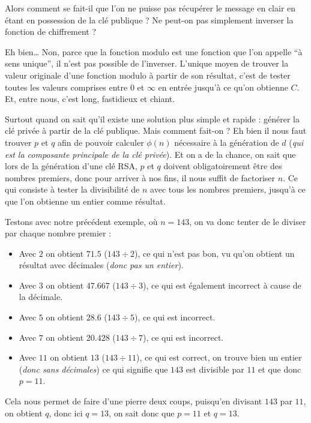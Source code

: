 \documentclass[
  paper=a4,
  ,captions=tableheading
]{scrartcl}
\providecommand{\tightlist}{%
  \setlength{\itemsep}{0pt}\setlength{\parskip}{0pt}}
\begin{document}
Alors comment se fait-il que l'on ne puisse pas récupérer le message en
clair en étant en possession de la clé publique ? Ne peut-on pas
simplement inverser la fonction de chiffrement ?

Eh bien\ldots{} Non, parce que la fonction \(\text{modulo}\) est une
fonction que l'on appelle ``à sens unique'', il n'est pas possible de
l'inverser. L'unique moyen de trouver la valeur originale d'une fonction
\(\text{modulo}\) à partir de son résultat, c'est de tester toutes les
valeurs comprises entre \(0\) et \(\infty\) en entrée jusqu'à ce qu'on
obtienne \(C\). Et, entre nous, c'est long, fastidieux et chiant.

Surtout quand on sait qu'il existe une solution plus simple et rapide :
générer la clé privée à partir de la clé publique. Mais comment fait-on
? Eh bien il nous faut trouver \(p\) et \(q\) afin de pouvoir calculer
\(\phi(n)\) nécessaire à la génération de \(d\) (\emph{qui est la
composante principale de la clé privée}). Et on a de la chance, on sait
que lors de la génération d'une clé RSA, \(p\) et \(q\) doivent
obligatoirement être des nombres premiers, donc pour arriver à nos fins,
il nous suffit de factoriser \(n\). Ce qui consiste à tester la
divisibilité de \(n\) avec tous les nombres premiers, jusqu'à ce que
l'on obtienne un entier comme résultat.

Testons avec notre précédent exemple, où \(n = 143\), on va donc tenter
de le diviser par chaque nombre premier :

\begin{itemize}
\tightlist
\item
  Avec \(2\) on obtient \(71.5\) (\(143 \div 2\)), ce qui n'est pas bon,
  vu qu'on obtient un résultat avec décimales (\emph{donc pas un
  entier}).
\item
  Avec \(3\) on obtient \(47.667\) (\(143\div3\)), ce qui est également
  incorrect à cause de la décimale.
\item
  Avec \(5\) on obtient \(28.6\) (\(143\div5\)), ce qui est incorrect.
\item
  Avec \(7\) on obtient \(20.428\) (\(143\div7\)), ce qui est incorrect.
\item
  Avec \(11\) on obtient \(13\) (\(143\div11\)), ce qui est correct, on
  trouve bien un entier (\emph{donc sans décimales}) ce qui signifie que
  \(143\) est divisible par \(11\) et que donc \(p = 11\).
\end{itemize}

Cela nous permet de faire d'une pierre deux coups, puisqu'en divisant
\(143\) par \(11\), on obtient \(q\), donc ici \(q = 13\), on sait donc
que \(p = 11\) et \(q = 13\).
\end{document}
